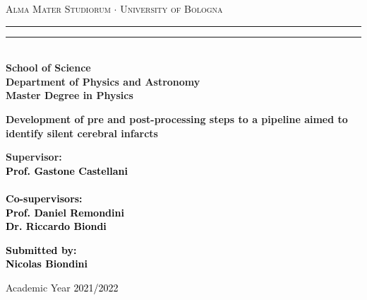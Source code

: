 \documentclass[12pt,a4paper]{report}
\begin{document}
\begin{titlepage}
%
%
%
%
\begin{center}
{{\Large{\textsc{Alma Mater Studiorum $\cdot$ University of  Bologna}}}} 
\rule[0.1cm]{15.8cm}{0.1mm}
\rule[0.5cm]{15.8cm}{0.6mm}
\\\vspace{3mm}
{\small{\bf School of Science \\
Department of Physics and Astronomy\\
Master Degree in Physics}}
\end{center}

\vspace{23mm}

\begin{center}
%
%
{\LARGE{\bf Development of pre and post-processing steps to a pipeline aimed to identify silent cerebral infarcts}}\\
\end{center}

\vspace{50mm} \par \noindent

\begin{minipage}[t]{0.47\textwidth}
%
%
{\large{\bf Supervisor: \vspace{2mm}\\\textcolor{black}{
Prof. Gastone Castellani}\\\\
%
%
%
\textcolor{black}{
\bf Co-supervisors:
\vspace{2mm}\\
Prof. Daniel Remondini \\
Dr. Riccardo Biondi\\}}}
\end{minipage}
%
\hfill
%
\begin{minipage}[t]{0.47\textwidth}\raggedleft \textcolor{black}{
{\large{\bf Submitted by:
\vspace{2mm}\\
%
%
\textcolor{black}{
Nicolas Biondini}}}
}
\end{minipage}

\vspace{40mm}

\begin{center}
%
%
Academic Year \textcolor{black}{ 2021/2022}
\end{center}

\end{titlepage}
\end{document}
